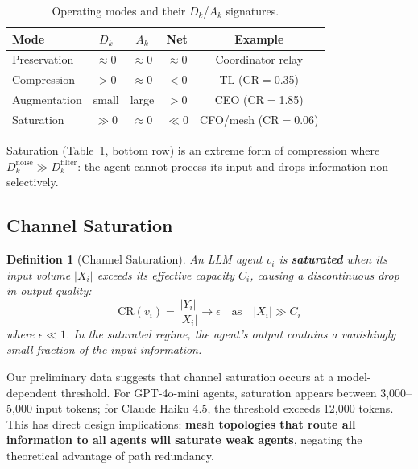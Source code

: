 \documentclass[conference]{IEEEtran}
\newtheorem{definition}{Definition}
\begin{document}
\begin{table}[t]
\centering
\caption{Operating modes and their $D_k$/$A_k$ signatures.}
\label{tab:mode_dk_ak}
\small
\begin{tabular}{lcccc}
\toprule
\textbf{Mode} & $D_k$ & $A_k$ & \textbf{Net} & \textbf{Example} \\
\midrule
Preservation & $\approx 0$ & $\approx 0$ & $\approx 0$ & Coordinator relay \\
Compression  & $> 0$       & $\approx 0$ & $< 0$       & TL (CR$=$0.35) \\
Augmentation & small       & large       & $> 0$       & CEO (CR$=$1.85) \\
Saturation   & $\gg 0$     & $\approx 0$ & $\ll 0$     & CFO/mesh (CR$=$0.06) \\
\bottomrule
\end{tabular}
\end{table}

Saturation (Table~\ref{tab:mode_dk_ak}, bottom row) is an extreme form of compression where $D_k^{\text{noise}} \gg D_k^{\text{filter}}$: the agent cannot process its input and drops information non-selectively.

\subsection{Channel Saturation}
\label{subsec:saturation}

\begin{definition}[Channel Saturation]
An LLM agent $v_i$ is \textbf{saturated} when its input volume $|X_i|$ exceeds its effective capacity $C_i$, causing a discontinuous drop in output quality:
\begin{equation}
    \text{CR}(v_i) = \frac{|Y_i|}{|X_i|} \to \epsilon \quad \text{as} \quad |X_i| \gg C_i
\end{equation}
where $\epsilon \ll 1$.
In the saturated regime, the agent's output contains a vanishingly small fraction of the input information.
\end{definition}

Our preliminary data suggests that channel saturation occurs at a model-dependent threshold.
For GPT-4o-mini agents, saturation appears between 3,000--5,000 input tokens; for Claude Haiku 4.5, the threshold exceeds 12,000 tokens.
This has direct design implications: \textbf{mesh topologies that route all information to all agents will saturate weak agents}, negating the theoretical advantage of path redundancy.
\end{document}
